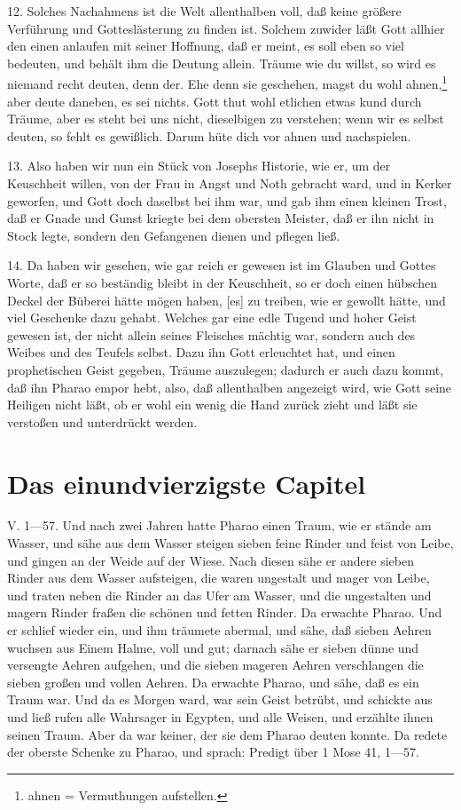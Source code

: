 12. Solches Nachahmens ist die Welt allenthalben voll, daß keine größere Verführung und Gotteslästerung zu finden ist. Solchem zuwider läßt Gott allhier den einen anlaufen mit seiner Hoffnung, daß er meint, es soll eben so viel bedeuten, und behält ihm die Deutung allein. Träume wie du willst, so wird es niemand recht deuten, denn der. Ehe denn sie geschehen, magst du wohl ahnen,\footnote{ahnen = Vermuthungen aufstellen.} aber deute daneben, es sei nichts. Gott thut wohl etlichen etwas kund durch Träume, aber es steht bei uns nicht, dieselbigen zu verstehen; wenn wir es selbst deuten, so fehlt es gewißlich. Darum hüte dich vor ahnen und nachspielen.

13. Also haben wir nun ein Stück von Josephs Historie, wie er, um der Keuschheit willen, von der Frau in Angst und Noth gebracht ward, und in Kerker geworfen, und Gott doch daselbst bei ihm war, und gab ihm einen kleinen Trost, daß er Gnade und Gunst kriegte bei dem obersten Meister, daß er ihn nicht in Stock legte, sondern den Gefangenen dienen und pflegen ließ.

14. Da haben wir gesehen, wie gar reich er gewesen ist im Glauben und Gottes Worte, daß er so beständig bleibt in der Keuschheit, so er doch einen hübschen Deckel der Büberei hätte mögen haben, [es] zu treiben, wie er gewollt hätte, und viel Geschenke dazu gehabt. Welches gar eine edle Tugend und hoher Geist gewesen ist, der nicht allein seines Fleisches mächtig war, sondern auch des Weibes und des Teufels selbst. Dazu ihn Gott erleuchtet hat, und einen prophetischen Geist gegeben, Träume auszulegen; dadurch er auch dazu kommt, daß ihn Pharao empor hebt, also, daß allenthalben angezeigt wird, wie Gott seine Heiligen nicht läßt, ob er wohl ein wenig die Hand zurück zieht und läßt sie verstoßen und unterdrückt werden.

\section{Das einundvierzigste Capitel}

V. 1—57. Und nach zwei Jahren hatte Pharao einen Traum, wie er stände am Wasser, und sähe aus dem Wasser steigen sieben feine Rinder und feist von Leibe, und gingen an der Weide auf der Wiese. Nach diesen sähe er andere sieben Rinder aus dem Wasser aufsteigen, die waren ungestalt und mager von Leibe, und traten neben die Rinder an das Ufer am Wasser, und die ungestalten und magern Rinder fraßen die schönen und fetten Rinder. Da erwachte Pharao. Und er schlief wieder ein, und ihm träumete abermal, und sähe, daß sieben Aehren wuchsen aus Einem Halme, voll und gut; darnach sähe er sieben dünne und versengte Aehren aufgehen, und die sieben mageren Aehren verschlangen die sieben großen und vollen Aehren. Da erwachte Pharao, und sähe, daß es ein Traum war. Und da es Morgen ward, war sein Geist betrübt, und schickte aus und ließ rufen alle Wahrsager in Egypten, und alle Weisen, und erzählte ihnen seinen Traum. Aber da war keiner, der sie dem Pharao deuten konnte. Da redete der oberste Schenke zu Pharao, und sprach:
Predigt über 1 Mose 41, 1—57.


